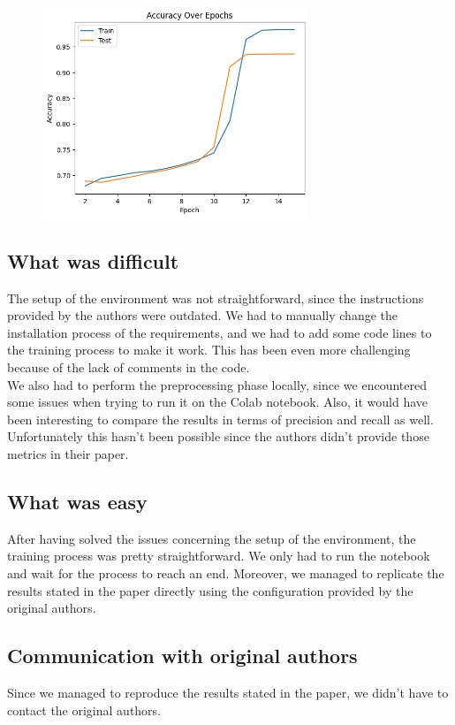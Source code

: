 \begin{figure}[h]
    \includegraphics[width=8cm]{Accuracy.png}
    \label{fig:accuracy}
\end{figure}


\subsection{What was difficult}

The setup of the environment was not straightforward, since the instructions provided by the authors were outdated. We had to manually change the installation process of the requirements, and we had to add some code lines to the training process to make it work. This has been even more challenging because of the lack of comments in the code. \\
We also had to perform the preprocessing phase locally, since we encountered some issues when trying to run it on the Colab notebook. Also, it would have been interesting to compare the results in terms of precision and recall as well. Unfortunately this hasn't been possible since the authors didn't provide those metrics in their paper. 

\subsection{What was easy}
After having solved the issues concerning the setup of the environment, the training process was pretty straightforward. We only had to run the notebook and wait for the process to reach an end. Moreover, we managed to replicate the results stated in the paper directly using the configuration provided by the original authors. 


\subsection{Communication with original authors}
Since we managed to reproduce the results stated in the paper, we didn't have to contact the original authors.
